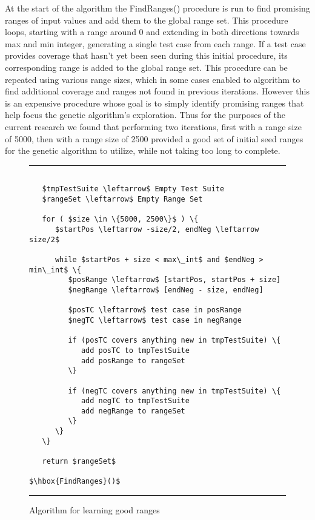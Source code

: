 \documentclass[runningheads]{llncs}
\begin{document}
At the start of the algorithm the FindRanges() procedure is run to find promising ranges of input values and add them to the global range set. This procedure loops, starting with a range around 0 and extending in both directions towards max and min integer, generating a single test case from each range. If a test case provides coverage that hasn't yet been seen during this initial procedure, its corresponding range is added to the global range set. This procedure can be repeated using various range sizes, which in some cases enabled to algorithm to find additional coverage and ranges not found in previous iterations. However this is an expensive procedure whose goal is to simply identify promising ranges that help focus the genetic algorithm's exploration. Thus for the purposes of the current research we found that performing two iterations, first with a range size of 5000, then with a range size of 2500 provided a good set of initial seed ranges for the genetic algorithm to utilize, while not taking too long to complete.
\begin{figure}[h!]
\begin{center}
\hrule
\medskip
\begin{Verbatim}[fontfamily=tt, xleftmargin=10pt, commandchars=\\\{\},
   codes={\catcode`$=3\catcode`^=7\catcode`_=8}]
        
   $tmpTestSuite \leftarrow$ Empty Test Suite
   $rangeSet \leftarrow$ Empty Range Set

   for ( $size \in \{5000, 2500\}$ ) \{
      $startPos \leftarrow -size/2, endNeg \leftarrow size/2$

      while $startPos + size < max\_int$ and $endNeg > min\_int$ \{
         $posRange \leftarrow$ [startPos, startPos + size]
         $negRange \leftarrow$ [endNeg - size, endNeg]

         $posTC \leftarrow$ test case in posRange
         $negTC \leftarrow$ test case in negRange

         if (posTC covers anything new in tmpTestSuite) \{
            add posTC to tmpTestSuite
            add posRange to rangeSet
         \}

         if (negTC covers anything new in tmpTestSuite) \{
            add negTC to tmpTestSuite
            add negRange to rangeSet
         \}
      \}
   \}
 
   return $rangeSet$
        
$\hbox{FindRanges}()$  
\end{Verbatim}
\hrule
\end{center}
\caption{Algorithm for learning good ranges \label{fig:ranges}}
\end{figure}
\end{document}
